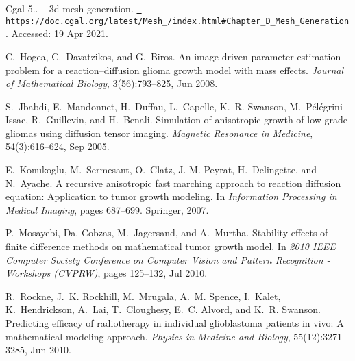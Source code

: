 
\begin{DoxyDescription}
\item[\label{citelist_CITEREF_cgal_2021}%
\Hypertarget{citelist_CITEREF_cgal_2021}%
\mbox{[}1\mbox{]}]Cgal 5.. -- 3d mesh generation. \href{https://doc.cgal.org/latest/Mesh_3/index.html\#Chapter_3D_Mesh_Generation}{\texttt{ https\+://doc.\+cgal.\+org/latest/\+Mesh\+\_/index.\+html\#\+Chapter\+\_\+D\+\_\+\+Mesh\+\_\+\+Generation}}. Accessed\+: 19 Apr 2021.


\item[\label{citelist_CITEREF_hogea_2008}%
\Hypertarget{citelist_CITEREF_hogea_2008}%
\mbox{[}2\mbox{]}]C.~Hogea, C.~Davatzikos, and G.~Biros. An image-\/driven parameter estimation problem for a reaction--diffusion glioma growth model with mass effects. {\itshape Journal of Mathematical Biology}, 3(56)\+:793--825, Jun 2008.


\item[\label{citelist_CITEREF_jbabdi_2005}%
\Hypertarget{citelist_CITEREF_jbabdi_2005}%
\mbox{[}3\mbox{]}]S.~Jbabdi, E.~Mandonnet, H.~Duffau, L.~Capelle, K.~R. Swanson, M.~P\'{e}l\'{e}grini-\/\+Issac, R.~Guillevin, and H.~Benali. Simulation of anisotropic growth of low-\/grade gliomas using diffusion tensor imaging. {\itshape Magnetic Resonance in Medicine}, 54(3)\+:616--624, Sep 2005.


\item[\label{citelist_CITEREF_konukoglu_2007}%
\Hypertarget{citelist_CITEREF_konukoglu_2007}%
\mbox{[}4\mbox{]}]E.~Konukoglu, M.~Sermesant, O.~Clatz, J.-\/M. Peyrat, H.~Delingette, and N.~Ayache. A recursive anisotropic fast marching approach to reaction diffusion equation\+: Application to tumor growth modeling. In {\itshape Information Processing in Medical Imaging}, pages 687--699. Springer, 2007.


\item[\label{citelist_CITEREF_mosayebi_2010}%
\Hypertarget{citelist_CITEREF_mosayebi_2010}%
\mbox{[}5\mbox{]}]P.~Mosayebi, Da. Cobzas, M.~Jagersand, and A.~Murtha. Stability effects of finite difference methods on mathematical tumor growth model. In {\itshape 2010 I\+E\+EE Computer Society Conference on Computer Vision and Pattern Recognition -\/ Workshops (C\+V\+P\+RW)}, pages 125--132, Jul 2010.


\item[\label{citelist_CITEREF_rockne_2010}%
\Hypertarget{citelist_CITEREF_rockne_2010}%
\mbox{[}6\mbox{]}]R.~Rockne, J.~K. Rockhill, M.~Mrugala, A.~M. Spence, I.~Kalet, K.~Hendrickson, A.~Lai, T.~Cloughesy, E.~C. Alvord, and K.~R. Swanson. Predicting efficacy of radiotherapy in individual glioblastoma patients in vivo\+: A mathematical modeling approach. {\itshape Physics in Medicine and Biology}, 55(12)\+:3271--3285, Jun 2010.



\end{DoxyDescription}
